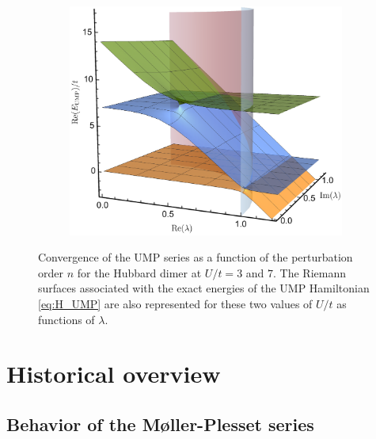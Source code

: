 \documentclass[aps,prb,reprint,noshowkeys,superscriptaddress]{revtex4-1}
\begin{document}
\begin{figure}
\begin{subfigure}{0.32\textwidth}
	\includegraphics[height=0.75\textwidth]{fig3c}	
    \end{subfigure}	\caption{
	Convergence of the UMP series as a function of the perturbation order $n$ for the Hubbard dimer at $U/t = 3$ and $7$.
	The Riemann surfaces associated with the exact energies of the UMP Hamiltonian \eqref{eq:H_UMP} are also represented for these two values of $U/t$ as functions of $\lambda$.
	\label{fig:UMP}}
\end{figure}


\section{Historical overview}

\subsection{Behavior of the M{\o}ller-Plesset series}
\end{document}
